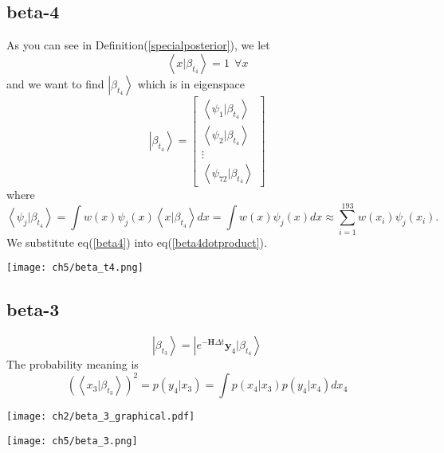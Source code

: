 \subsection{beta-4}
\begin{definition}
As you can see in Definition(\ref{specialposterior}), we let
\begin{equation}\label{beta4}
        \left<x|\beta_{t_4} \right>=1~~\forall x 
\end{equation}
and we want to find $\left|\beta_{t_4} \right> $ which is in eigenspace
\begin{equation}
        \left|\beta_{t_4} \right> = \begin{bmatrix}
                \left< \psi_1|\beta_{t_4} \right> \\ \left< \psi_2|\beta_{t_4} \right> \\ \vdots \\ 
                \left< \psi_{72}|\beta_{t_4} \right>
        \end{bmatrix} 
\end{equation}
where
\begin{equation}\label{beta4dotproduct}
        \left< \psi_j | \beta_{t_4} \right> = \int w(x) \psi_j(x)  \left<x|\beta_{t_4} \right> dx
        = \int w(x) \psi_j(x) dx \approx \sum_{i=1}^{193} w(x_i) \psi_j(x_i).
\end{equation}
We substitute eq(\ref{beta4}) into eq(\ref{beta4dotproduct}).
\begin{center}
        \texttt{[image: ch5/beta\_t4.png]}
\end{center}
\end{definition}

\subsection{beta-3}
\begin{definition}
\begin{equation}
        \left|\beta_{t_3}  \right> =  \left| e^{-\textbf{H}\Delta t} \textbf{y}_4 |\beta_{t_4} \right>
\end{equation}
The probability meaning is
\begin{equation}
   \left( \left<x_3 |\beta_{t_3}  \right> \right)^2 = p(y_4 | x_3) = \int p(x_4 | x_3) p(y_4 | x_4) dx_4
\end{equation}
\begin{center}
        \texttt{[image: ch2/beta\_3\_graphical.pdf]}
\end{center}
\begin{center}
        \texttt{[image: ch5/beta\_3.png]}
\end{center}
\end{definition}

